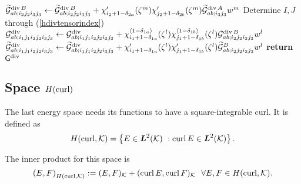 \begin{algorithm}[ht!]
\begin{algorithmic}
                                    \State$\widetilde{\mathcal{G}}_{ab;i_2j_2i_3j_3}^{\operatorname{div} B}\gets \widetilde{\mathcal{G}}_{ab;i_2j_2i_3j_3}^{\operatorname{div} B} + \chi_{i_2+1-\delta_{2a}}'(\zeta^m) \chi_{j_2+1-\delta_{2b}}'(\zeta^m) \widetilde{\mathcal{G}}_{ab;i_3j_3}^{\operatorname{div} A} w^m$
                                \EndIf
                        \EndFor       
                \EndFor
            \EndFor            
                            \State Determine $I,J$ through (\ref{hdivtensorindex})
                                            \State$\mathcal{G}_{ab;i_1j_1i_2j_2i_3j_3}^{\operatorname{div}}\gets \mathcal{G}_{ab;i_1j_1i_2j_2i_3j_3}^{\operatorname{div}} + \chi_{i_1+1-\delta_{1a}}^{\langle1-\delta_{1a}\rangle}(\zeta^l) \chi_{j_1+1-\delta_{1b}}^{\langle1-\delta_{1b}\rangle}(\zeta^l) \mathcal{G}_{ab;i_2j_2i_3j_3}^{\operatorname{div} B} w^l$ 
                                            \State$\widetilde{\mathcal{G}}_{ab;i_1j_1i_2j_2i_3j_3}^{\operatorname{div}}\gets \widetilde{\mathcal{G}}_{ab;i_1j_1i_2j_2i_3j_3}^{\operatorname{div}} + \chi_{i_1+1-\delta_{1a}}'(\zeta^l) \chi_{j_1+1-\delta_{1b}}'(\zeta^l) \widetilde{\mathcal{G}}_{ab;i_2j_2i_3j_3}^{B} w^l$
                                        \EndIf
                                \EndFor
                            \EndIf
                    \EndFor
            \EndFor
        \EndFor
    \EndFor
\EndFor
\State \textbf{return} $\mathsf{G}^{\operatorname{div}}$
\EndProcedure
\end{algorithmic}
\end{algorithm}
% 
%
\subsection{Space \texorpdfstring{$H(\operatorname{curl})$}{H(curl)}}
%
The last energy space needs its functions to have a square-integrable curl. It is defined as
%
\begin{equation}
    H(\operatorname{curl},\mathcal{K})=\left\{ E\in\boldsymbol{L}^2(\mathcal{K})\ :\operatorname{curl} E\in\boldsymbol{L}^2(\mathcal{K})\right\}.
\end{equation}

\noindent The inner product for this space is
%
\begin{equation}
    \left(E,F\right)_{H(\operatorname{curl},\mathcal{K})}:=(E,F)_{\mathcal{K}}+(\operatorname{curl} E,\operatorname{curl} F)_{\mathcal{K}}\ \ \forall E,F\in H(\operatorname{curl},\mathcal{K}).
\end{equation}

